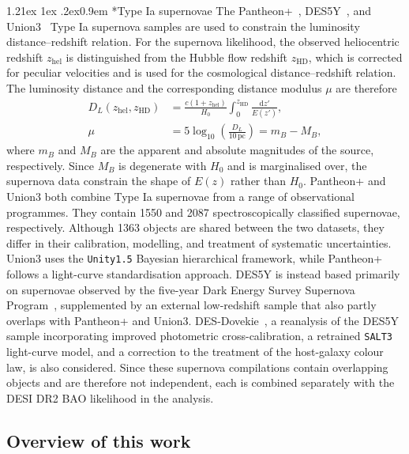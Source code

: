 \documentclass[aps,prd,reprint,preprintnumbers,showpacs,floatfix,nofootinbib,superscriptaddress]{revtex4-2}
\makeatletter
\renewcommand{\paragraph}{%
\@startsection{paragraph}{4}%
{\z@}{1.21ex \@plus 1ex \@minus .2ex}{0.9em}%
{\normalfont\normalsize\bfseries}%
}
\makeatother
\begin{document}
\paragraph*{Type Ia supernovae}
The Pantheon+~\citep{Brout:2022vxf}, DES5Y~\citep{DES:2024jxu}, and Union3~\citep{Rubin:2023ovl} Type Ia supernova samples are used to constrain the luminosity distance--redshift relation. For the supernova likelihood, the observed heliocentric redshift $z_\mathrm{hel}$ is distinguished from the Hubble flow redshift $z_\mathrm{HD}$, which is corrected for peculiar velocities and is used for the cosmological distance--redshift relation. The luminosity distance and the corresponding distance modulus $\mu$ are therefore
\begin{equation}
		\begin{aligned}
				D_L(z_\mathrm{hel},z_\mathrm{HD}) &= \frac{c(1+z_\mathrm{hel})}{H_0} \int_0^{z_\mathrm{HD}}\frac{\mathrm{d}z'}{E(z')}, \\
			 \mu &= 5\log_{10}\left(\frac{D_L}{10\,\mathrm{pc}}\right) = m_B-M_B,
			\end{aligned}
\end{equation}
where $m_B$ and $M_B$ are the apparent and absolute magnitudes of the source, respectively. Since $M_B$ is degenerate with $H_0$ and is marginalised over, the supernova data constrain the shape of $E(z)$ rather than $H_0$. Pantheon+ and Union3 both combine Type Ia supernovae from a range of observational programmes. They contain 1550 and 2087 spectroscopically classified supernovae, respectively. Although 1363 objects are shared between the two datasets, they differ in their calibration, modelling, and treatment of systematic uncertainties. Union3 uses the \texttt{Unity1.5} Bayesian hierarchical framework, while Pantheon+ follows a light-curve standardisation approach. DES5Y is instead based primarily on supernovae observed by the five-year Dark Energy Survey Supernova Program~\citep{DES:2024hip}, supplemented by an external low-redshift sample that also partly overlaps with Pantheon+ and Union3. DES-Dovekie~\citep{Popovic:2025glk}, a reanalysis of the DES5Y sample incorporating improved photometric cross-calibration, a retrained \texttt{SALT3} light-curve model, and a correction to the treatment of the host-galaxy colour law, is also considered. Since these supernova compilations contain overlapping objects and are therefore not independent, each is combined separately with the DESI DR2 BAO likelihood in the analysis.

\subsection{Overview of this work}
\end{document}
